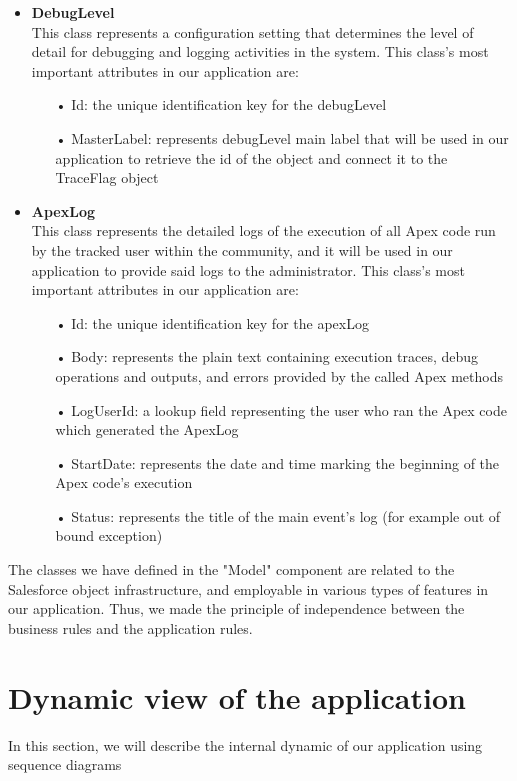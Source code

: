 \begin{itemize}
\begin{itemize}
\end{itemize}
\item \textbf{DebugLevel}\\
This class represents a configuration setting that determines the level of detail for debugging and logging activities in the system. This class's most important attributes in our application are:
\begin{itemize}
\item[•] Id: the unique identification key for the debugLevel
\item[•] MasterLabel: represents debugLevel main label that will be used in our application to retrieve the id of the object and connect it to the TraceFlag object

\end{itemize}
\item \textbf{ApexLog}\\
This class represents the detailed logs of the execution of all Apex code run by the tracked user within the community, and it will be used in our application to provide said logs to the administrator. This class's most important attributes in our application are:
\begin{itemize}
\item[•] Id: the unique identification key for the apexLog
\item[•] Body: represents the plain text containing execution traces, debug operations and outputs, and errors provided by the called Apex methods
\item[•] LogUserId: a lookup field representing the user who ran the Apex code which generated the ApexLog
\item[•] StartDate: represents the date and time marking the beginning of the Apex code's execution
\item[•] Status: represents the title of the main event's log (for example out of bound exception)

\end{itemize}
\end{itemize}
The classes we have defined in the "Model" component are related to the Salesforce object infrastructure, and employable in various types of features in our application. Thus, we made the
principle of independence between the business rules and the application rules.\\


\section{Dynamic view of the application}
In this section, we will describe the internal dynamic of our application using sequence diagrams 
